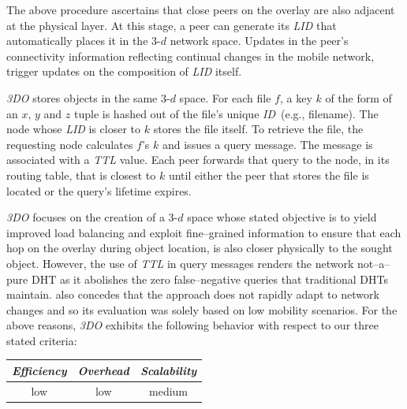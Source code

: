 The above procedure ascertains that close peers on the
overlay are also adjacent at the physical layer. 
At this stage, a peer can generate its \emph{LID}
that automatically places it in the $3$-$d$ network space.
Updates in the peer's connectivity information 
reflecting continual changes in the mobile network,
trigger updates on the composition of \emph{LID} itself.

\emph{3DO} stores objects in the same $3$-$d$ space. For each
file $f$, a key $k$ of the form of an $x$, $y$ and $z$ tuple
is hashed out of the file's unique \emph{ID}~(e.g., filename).
The node whose \emph{LID} is closer to $k$ stores the
file itself.
To retrieve the file, the requesting node calculates $f$'s $k$
and issues a query message. 
The message is associated with a \emph{TTL} value. 
Each peer forwards that query to the node,
in its routing table, that is closest to $k$ until either the peer
that stores the file is located or the query's lifetime expires.

\emph{3DO} focuses on
the creation of a $3$-$d$ space whose stated objective is to
yield improved load balancing 
and exploit fine--grained information to ensure
that each hop on the overlay during object location, 
is also closer physically to the sought object.
However, the use of \emph{TTL} in query messages
renders the network not--a--pure DHT as it abolishes 
the zero false--negative queries that traditional DHTs maintain.
\cite{AOS2014} also concedes that the approach
does not rapidly adapt to network changes and so
its evaluation was solely based on low mobility scenarios. 
For the above reasons, \emph{3DO} exhibits the following behavior 
with respect to our three stated criteria:
\begin{center}
{\footnotesize
\begin{tabular}{ccc}
\emph{Efficiency} & \emph{Overhead} & \emph{Scalability} \\
\hline
% 
low &
% 
low &
% 
medium
\end{tabular}
}
\end{center}



